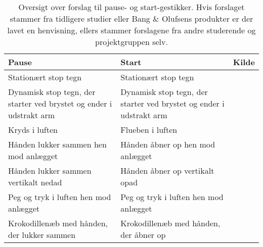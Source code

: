 \begin{table}[H]
	\centering
	\begin{tabular}{| p{4cm} | p{4cm} | p{4cm} |}
		\hline
		\textbf{Pause} & \textbf{Start} & \textbf{Kilde} \\ \hline
		Stationært stop tegn & Stationært stop tegn & \parencite[s. 166]{PDF:ComparingInputModalities} \\ \hline
		Dynamisk stop tegn, der starter ved brystet og ender i udstrakt arm  & Dynamisk stop tegn, der starter ved brystet og ender i udstrakt arm &  \\ \hline
		Kryds i luften & Flueben i luften & \parencite[s. 48]{PDF:UserDefinedGesturesTV} \\ \hline
		Hånden lukker sammen hen mod anlægget & Hånden åbner op hen mod anlægget & \\ \hline
		Hånden lukker sammen vertikalt nedad & Hånden åbner op vertikalt opad &  \\ \hline
		Peg og tryk i luften hen mod anlægget & Peg og tryk i luften hen mod anlægget & \parencite[s. 48]{PDF:UserDefinedGesturesTV} \\ \hline
		Krokodillenæb med hånden, der lukker sammen & Krokodillenæb med hånden, der åbner op & \parencite[s. 48]{PDF:UserDefinedGesturesTV} \\ \hline
	\end{tabular}
	\caption{Oversigt over forslag til pause- og start-gestikker. Hvis forslaget stammer fra tidligere studier eller Bang $\&$ Olufsens produkter er der lavet en henvisning, ellers stammer forslagene fra andre studerende og projektgruppen selv.}
	\label{tab:IndsamledeGestikkerPause}
\end{table}
\noindent

